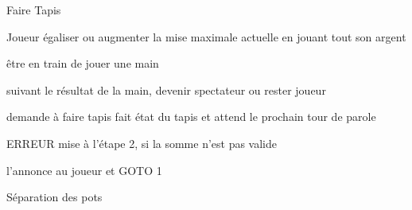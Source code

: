 \begin{usecase}{Faire Tapis}
	
	\begin{presentation}
		\actor Joueur
		\goal égaliser ou augmenter la mise maximale actuelle en jouant tout son argent
		
		\begin{precondition}
			\condition être en train de jouer une main
		\end{precondition}
		
		\begin{postcondition}
			\condition suivant le résultat de la main, devenir spectateur ou rester joueur
		\end{postcondition}
		
		\begin{includeuc}
			\aucun
		\end{includeuc}
	\end{presentation}
	
	\begin{scenario}
		\start demande à faire tapis 
			\system fait état du tapis et attend le prochain tour de parole
	\end{scenario}
	
	\begin{alternative}
		\nomalt ERREUR mise
			\condition à l'étape 2, si la somme n'est pas valide
			
		\begin{alt}
			\system l'annonce au joueur et GOTO 1
		\end{alt}
	\end{alternative}
	
	\begin{regles}
		\nom Séparation des pots
	\end{regles}
	
	
\end{usecase}



